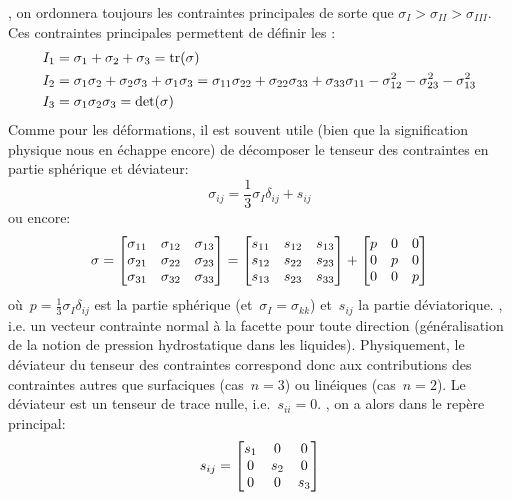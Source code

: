 , on ordonnera toujours les contraintes principales de sorte que $\sigma_I > \sigma_{II} > \sigma_{III}$.
\medskipvm
Ces contraintes principales permettent de définir les :
\begin{align}
I_1 &= \sigma_1 + \sigma_2 + \sigma_3 = \operatorname{tr}(\sigma) \\
I_2 &= \sigma_1 \sigma_2 + \sigma_2 \sigma_3 + \sigma_1 \sigma_3= \sigma_{11}\sigma_{22} + \sigma_{22}\sigma_{33} + \sigma_{33}\sigma_{11} -\sigma_{12}^2 - \sigma_{23}^2 - \sigma_{13}^2\\ I_3 &= \sigma_1 \sigma_2 \sigma_3 = \det(\sigma) 
\end{align}
\medskipvm
Comme pour les déformations, il est souvent utile (bien que la signification physique nous en échappe encore) de décomposer le tenseur des contraintes en partie sphérique et déviateur:
\begin{equation} \sigma_{ij} = \frac13\sigma_I\delta_{ij}+s_{ij}
\end{equation}
ou encore:
\begin{equation}
\sigma =
\MM*{\sigma_{11}&\sigma_{12}&\sigma_{13}\\ \sigma_{21}&\sigma_{22}&\sigma_{23}\\
\sigma_{31}&\sigma_{32}&\sigma_{33}}
=
\MM*{s_{11}&s_{12}&s_{13}\\ s_{12}&s_{22}&s_{23}\\
s_{13}&s_{23}&s_{33}}
+\MM*{p&0&0\\0&p&0\\0&0&p}
\end{equation}
où~$p=\frac13\sigma_I\delta_{ij}$ est la partie sphérique (et~$\sigma_I=\sigma_{kk}$) et~$s_{ij}$ la partie déviatorique.
\medskipvm
{}, i.e. un vecteur contrainte normal à la facette pour toute direction (généralisation de la notion de pression hydrostatique dans les liquides).
\medskipvm
Physiquement, le déviateur du tenseur des contraintes correspond donc aux contributions des contraintes autres que surfaciques (cas~$n = 3$) ou linéiques (cas~$n = 2$). Le déviateur est un tenseur de trace nulle, i.e.~$s_{ii}=0$.
\medskipvm
{}, on a alors dans le repère principal:
\begin{equation}
s_{ij} = \MM*{s_{1} & 0 & 0 \\ 0 & s_{2} & 0 \\ 0 & 0 & s_{3}} 
\end{equation}
